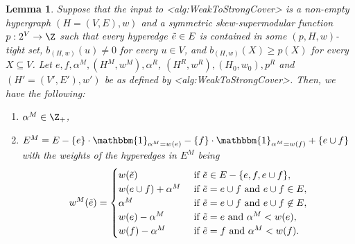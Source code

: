 \documentclass{article}
\def\Cref#1{<#1>}%
\newtheorem{lemma}{Lemma}[section]
\newcommand{\indicator}{\ensuremath{\mathbbm{1}}\xspace}
\newcommand{\knote}[1]{{\color{red}[{\tiny Karthik: \bf #1}]\marginpar{\color{red}*}}}
\newcommand{\maximalTightSetContainingHyperedge}[1]{\ensuremath{\tau_{#1}}\xspace}
\begin{document}
\begin{lemma}\label{lem:WeakToStrong:properties-of-alpha^M-and-alpha^R}
    Suppose that the input to \Cref{alg:WeakToStrongCover} is a non-empty hypergraph $(H = (V, E), w)$ and a symmetric skew-supermodular function $p:2^V\rightarrow \Z$ 
such that every hyperedge $\Tilde{e} \in E$ is contained in some $(p, H, w)$-tight set, $b_{(H,w)}(u) \not = 0$ for every $u \in V$, and $b_{(H,w)}(X) \geq p(X)$ for every $X \subseteq V$. 
    Let $e, f, \alpha^M, (H^M, w^M), \alpha^R$, $(H^R, w^R),(H_0, w_0), p^R$ and $(H' = (V', E'), w')$ be as defined by \Cref{alg:WeakToStrongCover}. 
    Then, we have the following:
    \begin{enumerate}[label=(\arabic*)]
        \item $\alpha^M \in \Z_+$,
        \item 
        $E^M=E-\{e\}\cdot \indicator_{\alpha^M= w(e)}- \{f\}\cdot \indicator_{\alpha^M = w(f)} + \{e\cup f\}$ with the weights of the hyperedges in $E^M$ being  
        \[
        w^M(\Tilde{e})=
        \begin{cases}
            w(\Tilde{e}) &\text { if } \Tilde{e}\in E-\{e, f, e\cup f\},\\
            w(e\cup f) + \alpha^M &\text { if } \Tilde{e}=e\cup f \text{ and } e\cup f \in E, \\
            \alpha^M &\text { if } \Tilde{e}=e\cup f \text{ and } e\cup f \not \in E, \\
            w(e) - \alpha^M &\text { if } \Tilde{e}=e \text{ and } \alpha^M<w(e), \\
            w(f) - \alpha^M &\text { if } \Tilde{e}=f \text{ and } \alpha^M<w(f).
        \end{cases}
        \]

\end{enumerate}
\end{lemma}
\end{document}
